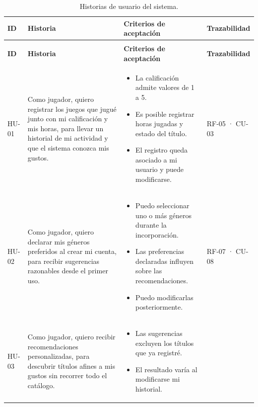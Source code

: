 \begin{longtable}{|>{\raggedright\arraybackslash}p{1cm}|>{\raggedright\arraybackslash}p{4.6cm}|>{\raggedright\arraybackslash}p{5.2cm}|>{\raggedright\arraybackslash}p{2cm}|}
	\caption{Historias de usuario del sistema.}\label{tab:historias_usuario} \\
	\hline
	\textbf{ID} & \textbf{Historia} & \textbf{Criterios de aceptación} & \textbf{Trazabilidad} \\
	\hline
	\endfirsthead
	\multicolumn{4}{l}{\textit{Continuación de la Tabla \ref{tab:historias_usuario}}} \\
	\hline
	\textbf{ID} & \textbf{Historia} & \textbf{Criterios de aceptación} & \textbf{Trazabilidad} \\
	\hline
	\endhead
	\hline
	\endfoot
	\hline
	\endlastfoot
	HU-01 & Como jugador, quiero registrar los juegos que jugué junto con mi calificación y mis horas, para llevar un historial de mi actividad y que el sistema conozca mis gustos. &
	\begin{itemize}[leftmargin=1em, itemsep=1pt, topsep=1pt]
		\item La calificación admite valores de 1 a 5.
		\item Es posible registrar horas jugadas y estado del título.
		\item El registro queda asociado a mi usuario y puede modificarse.
	\end{itemize} & RF-05 · CU-03 \\
	HU-02 & Como jugador, quiero declarar mis géneros preferidos al crear mi cuenta, para recibir sugerencias razonables desde el primer uso. &
	\begin{itemize}[leftmargin=1em, itemsep=1pt, topsep=1pt]
		\item Puedo seleccionar uno o más géneros durante la incorporación.
		\item Las preferencias declaradas influyen sobre las recomendaciones.
		\item Puedo modificarlas posteriormente.
	\end{itemize} & RF-07 · CU-08 \\
	HU-03 & Como jugador, quiero recibir recomendaciones personalizadas, para descubrir títulos afines a mis gustos sin recorrer todo el catálogo. &
	\begin{itemize}[leftmargin=1em, itemsep=1pt, topsep=1pt]
		\item Las sugerencias excluyen los títulos que ya registré.
		\item El resultado varía al modificarse mi historial.

\end{itemize}
\end{longtable}
